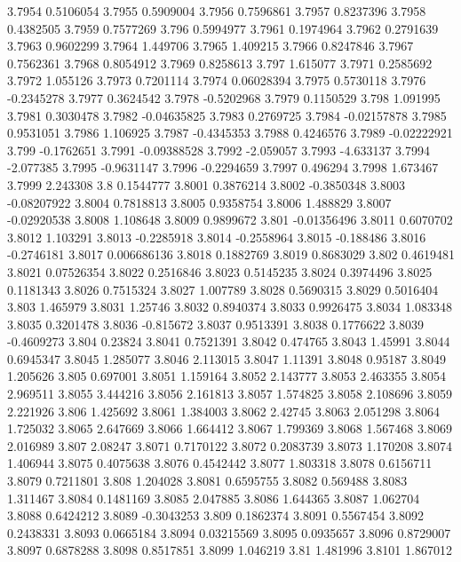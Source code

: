 3.7954  0.5106054
3.7955  0.5909004
3.7956  0.7596861
3.7957  0.8237396
3.7958  0.4382505
3.7959  0.7577269
3.796  0.5994977
3.7961  0.1974964
3.7962  0.2791639
3.7963  0.9602299
3.7964  1.449706
3.7965  1.409215
3.7966  0.8247846
3.7967  0.7562361
3.7968  0.8054912
3.7969  0.8258613
3.797  1.615077
3.7971  0.2585692
3.7972  1.055126
3.7973  0.7201114
3.7974  0.06028394
3.7975  0.5730118
3.7976  -0.2345278
3.7977  0.3624542
3.7978  -0.5202968
3.7979  0.1150529
3.798  1.091995
3.7981  0.3030478
3.7982  -0.04635825
3.7983  0.2769725
3.7984  -0.02157878
3.7985  0.9531051
3.7986  1.106925
3.7987  -0.4345353
3.7988  0.4246576
3.7989  -0.02222921
3.799  -0.1762651
3.7991  -0.09388528
3.7992  -2.059057
3.7993  -4.633137
3.7994  -2.077385
3.7995  -0.9631147
3.7996  -0.2294659
3.7997  0.496294
3.7998  1.673467
3.7999  2.243308
3.8  0.1544777
3.8001  0.3876214
3.8002  -0.3850348
3.8003  -0.08207922
3.8004  0.7818813
3.8005  0.9358754
3.8006  1.488829
3.8007  -0.02920538
3.8008  1.108648
3.8009  0.9899672
3.801  -0.01356496
3.8011  0.6070702
3.8012  1.103291
3.8013  -0.2285918
3.8014  -0.2558964
3.8015  -0.188486
3.8016  -0.2746181
3.8017  0.006686136
3.8018  0.1882769
3.8019  0.8683029
3.802  0.4619481
3.8021  0.07526354
3.8022  0.2516846
3.8023  0.5145235
3.8024  0.3974496
3.8025  0.1181343
3.8026  0.7515324
3.8027  1.007789
3.8028  0.5690315
3.8029  0.5016404
3.803  1.465979
3.8031  1.25746
3.8032  0.8940374
3.8033  0.9926475
3.8034  1.083348
3.8035  0.3201478
3.8036  -0.815672
3.8037  0.9513391
3.8038  0.1776622
3.8039  -0.4609273
3.804  0.23824
3.8041  0.7521391
3.8042  0.474765
3.8043  1.45991
3.8044  0.6945347
3.8045  1.285077
3.8046  2.113015
3.8047  1.11391
3.8048  0.95187
3.8049  1.205626
3.805  0.697001
3.8051  1.159164
3.8052  2.143777
3.8053  2.463355
3.8054  2.969511
3.8055  3.444216
3.8056  2.161813
3.8057  1.574825
3.8058  2.108696
3.8059  2.221926
3.806  1.425692
3.8061  1.384003
3.8062  2.42745
3.8063  2.051298
3.8064  1.725032
3.8065  2.647669
3.8066  1.664412
3.8067  1.799369
3.8068  1.567468
3.8069  2.016989
3.807  2.08247
3.8071  0.7170122
3.8072  0.2083739
3.8073  1.170208
3.8074  1.406944
3.8075  0.4075638
3.8076  0.4542442
3.8077  1.803318
3.8078  0.6156711
3.8079  0.7211801
3.808  1.204028
3.8081  0.6595755
3.8082  0.569488
3.8083  1.311467
3.8084  0.1481169
3.8085  2.047885
3.8086  1.644365
3.8087  1.062704
3.8088  0.6424212
3.8089  -0.3043253
3.809  0.1862374
3.8091  0.5567454
3.8092  0.2438331
3.8093  0.0665184
3.8094  0.03215569
3.8095  0.0935657
3.8096  0.8729007
3.8097  0.6878288
3.8098  0.8517851
3.8099  1.046219
3.81  1.481996
3.8101  1.867012
